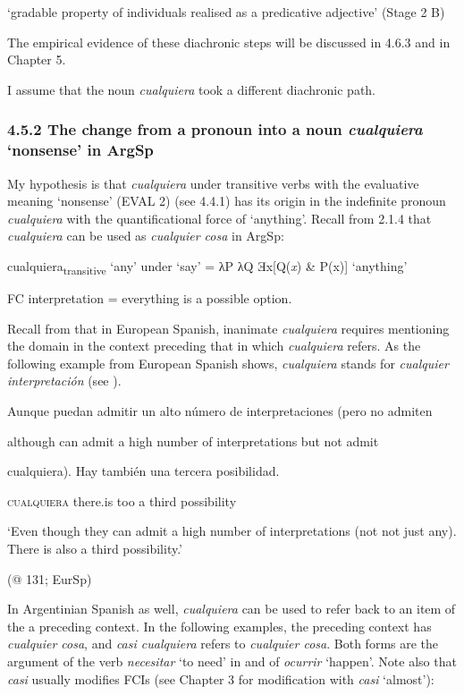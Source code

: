 \documentclass[output=paper]{langscibook}
\begin{document}
\begin{styleTabellenInhalt}
‘gradable property of individuals realised as a predicative adjective’     (Stage 2 B)
\end{styleTabellenInhalt}

The empirical evidence of these diachronic steps will be discussed in 4.6.3 and in Chapter 5.

I assume that the noun \textit{cualquiera} took a different diachronic path. 

\subsubsection{\textbf{4.5.2} \textbf{The} \textbf{change} \textbf{from} \textbf{a} \textbf{pronoun} \textbf{into} \textbf{a} \textbf{noun} \textbf{\textit{cualquiera}} \textbf{‘nonsense’} \textbf{in} \textbf{ArgSp}}

My hypothesis is that \textit{cualquiera} under transitive verbs with the evaluative meaning ‘nonsense’ (EVAL 2) (see 4.4.1) has its origin in the indefinite pronoun \textit{cualquiera} with the quantificational force of ‘anything’. Recall from 2.1.4 that \textit{cualquiera} can be used as \textit{cualquier cosa} in ArgSp: 

    cualquiera\textsubscript{transitive} ‘any’ under ‘say’ = λP λQ Ǝx[Q(\textit{x}) \& P(x)] ‘anything’ 

FC interpretation = everything is a possible option.

Recall from  that in European Spanish, inanimate \textit{cualquiera} requires mentioning the domain in the context preceding that in which \textit{cualquiera} refers. As the following example from European Spanish shows, \textit{cualquiera} stands for \textit{cualquier interpretación} (see ).

    Aunque  puedan  admitir  un  alto  número  de  interpretaciones  (pero  no  admiten

    although  can  admit  a  high  number  of  interpretations  but  not  admit

    cualquiera).  Hay  también  una  tercera  posibilidad.

    \textsc{cualquiera}  there.is  too  a  third  possibility

    ‘Even though they can admit a high number of interpretations (not not just any). There is also a third possibility.’

    (@ 131; EurSp)

In Argentinian Spanish as well, \textit{cualquiera} can be used to refer back to an item of the a preceding context. In the following examples, the preceding context has \textit{cualquier cosa}, and \textit{casi cualquiera} refers to \textit{cualquier cosa}. Both forms are the argument of the verb \textit{necesitar} ‘to need’ in  and of \textit{ocurrir} ‘happen’. Note also that \textit{casi} usually modifies FCIs (see Chapter 3 for modification with \textit{casi} ‘almost’):
\end{document}
